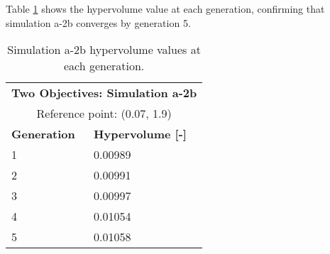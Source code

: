 Table \ref{tab:a2b-hypervolume} shows the hypervolume value at each generation, 
confirming that simulation a-2b converges by generation 5. 
\begin{table}[htbp!]
    \centering
    \onehalfspacing
    \caption{Simulation a-2b hypervolume values at each generation.}
	\label{tab:a2b-hypervolume}
    \footnotesize
    \begin{tabular}{ll}
    \hline 
    \multicolumn{2}{c}{\textbf{Two Objectives: Simulation a-2b}} \\
    \multicolumn{2}{c}{Reference point: (0.07, 1.9)} \\
    \hline 
    \textbf{Generation} & \textbf{Hypervolume [-]} \\
    \hline
    1 & 0.00989 \\
    2 & 0.00991 \\
    3 & 0.00997 \\
    4 & 0.01054\\
    5 & 0.01058\\
    \hline
    \end{tabular}
\end{table}

